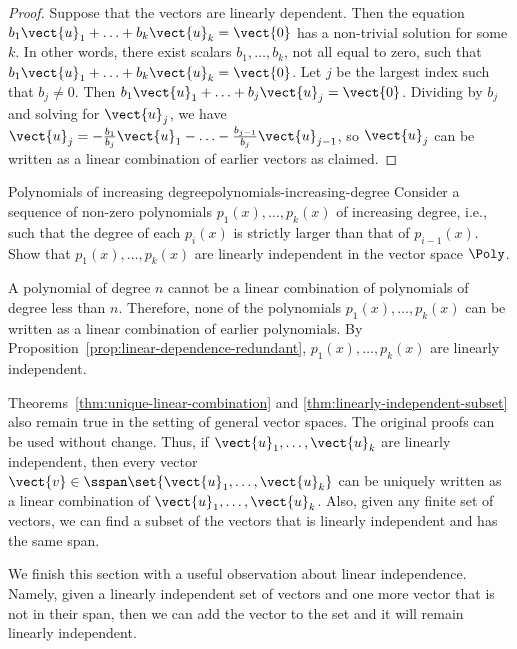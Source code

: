 \begin{proof}
  Suppose that the vectors are linearly dependent. Then the equation
  $b_1\vect{u}_1+\ldots+b_k\vect{u}_k=\vect{0}$ has a non-trivial solution
  for some $k$. In other words, there exist scalars $b_1,\ldots,b_k$,
  not all equal to zero, such that
  $b_1\vect{u}_1+\ldots+b_k\vect{u}_k=\vect{0}$. Let $j$ be the largest index
  such that $b_j\neq 0$. Then
  $b_1\vect{u}_1+\ldots+b_j\vect{u}_j=\vect{0}$. Dividing by $b_j$ and
  solving for $\vect{u}_j$, we have
  $\vect{u}_j = -\frac{b_1}{b_j}\vect{u}_1 - \ldots -
  \frac{b_{j-1}}{b_j}\vect{u}_{j-1}$, so $\vect{u}_j$ can be written
  as a linear combination of earlier vectors as claimed.
\end{proof}

\begin{example}{Polynomials of increasing degree}{polynomials-increasing-degree}
  Consider a sequence of non-zero polynomials $p_1(x), \ldots, p_k(x)$
  of increasing degree, i.e., such that the degree of each $p_i(x)$ is
  strictly larger than that of $p_{i-1}(x)$. Show that
  $p_1(x),\ldots,p_k(x)$ are linearly independent in the vector space
  $\Poly$.
\end{example}

\begin{solution}
  A polynomial of degree $n$ cannot be a linear combination of
  polynomials of degree less than $n$. Therefore, none of the
  polynomials $p_1(x), \ldots, p_k(x)$ can be written as a linear
  combination of earlier polynomials. By
  Proposition~\ref{prop:linear-dependence-redundant}, $p_1(x), \ldots,
  p_k(x)$ are linearly independent.
\end{solution}

Theorems~\ref{thm:unique-linear-combination} and
{\ref{thm:linearly-independent-subset}} also remain true in the
setting of general vector spaces. The original proofs can be used
without change. Thus, if $\vect{u}_1,\ldots,\vect{u}_k$ are linearly
independent, then every vector
$\vect{v}\in\sspan\set{\vect{u}_1,\ldots,\vect{u}_k}$ can be uniquely
written as a linear combination of
$\vect{u}_1,\ldots,\vect{u}_k$. Also, given any finite set of vectors,
we can find a subset of the vectors that is linearly independent and
has the same span.

We finish this section with a useful observation about linear
independence. Namely, given a linearly independent set of vectors and
one more vector that is not in their span, then we can add the vector
to the set and it will remain linearly independent.

